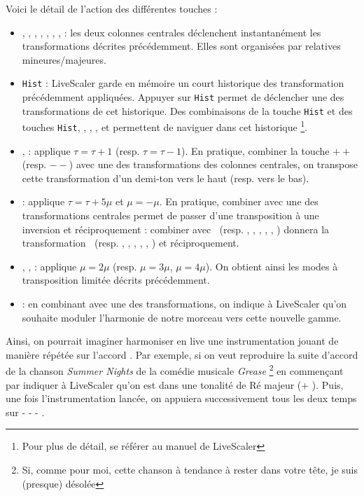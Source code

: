 Voici le détail de l'action des différentes touches : 
\begin{itemize}
  \item \LSI, \LSvi, \LSIV, \LSII, \LSV, \LSiii, \LSII, \LSvii :  les deux colonnes centrales déclenchent instantanément les transformations décrites précédemment. Elles sont organisées par relatives mineures/majeures.
  \item  \texttt{Hist} : LiveScaler garde en mémoire un court historique des transformation précédemment appliquées. Appuyer sur \texttt{Hist} permet de déclencher une des transformations de cet historique. Des combinaisons de la touche \texttt{Hist} et des touches \texttt{Hist}, \LSMm, \LStwo, \LSthree, et \LSfour permettent de naviguer dans cet historique \footnote{Pour plus de détail, se référer au manuel de LiveScaler}. 
  \item \LSpp, \LSmm : applique  $\tau = \tau + 1$ (resp. $\tau = \tau - 1$). En pratique, combiner la touche $++$ (resp. $--$) avec une des transformations des colonnes centrales, on transpose cette transformation d'un demi-ton vers le haut (resp. vers le bas). 
  \item  \LSMm : applique $\tau = \tau + 5\mu $ et $\mu = -\mu$.  En pratique, combiner \LSMm avec une des transformations centrales permet de passer d'une transposition à une inversion et réciproquement : combiner \LSMm avec \LSI $~$ (resp. \LSii, \LSiii, \LSIV, \LSV, \LSvi, \LSvii) donnera la transformation \LSi $~$ (resp.  \LSII, \LSIII, \LSiv, \LSv, \LSVI, \LSVII) et réciproquement. 
  \item \LStwo, \LSthree, \LSfour : applique $\mu = 2\mu$ (resp. $\mu = 3\mu$, $\mu = 4\mu$). On obtient ainsi les modes à transposition limitée décrits précédemment.
  \item \LSMod : en combinant \LSMod avec une des transformations, on indique à LiveScaler qu'on souhaite moduler l'harmonie de notre morceau vers cette nouvelle gamme. 
\end{itemize}

Ainsi, on pourrait imaginer harmoniser en live une instrumentation jouant de manière répétée sur l'accord . Par exemple, si on veut reproduire la suite d'accord de la chanson \emph{Summer Nights} de la comédie musicale \emph{Grease} \footnote{Si, comme pour moi, cette chanson à tendance à rester dans votre tête, je suis (presque) désolée} en commençant par indiquer à LiveScaler qu'on est dans une tonalité de Ré majeur (\LSMod + \LSII). Puis, une fois l'instrumentation lancée, on appuiera successivement tous les deux temps sur  \LSI - \LSIV - \LSV - \LSIV.

